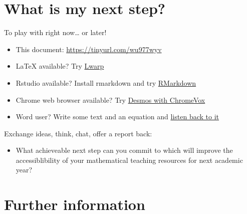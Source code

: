 \documentclass[
  12pt,
  a4paper]{extarticle}
\providecommand{\tightlist}{%
  \setlength{\itemsep}{0pt}\setlength{\parskip}{0pt}}
\theoremstyle{plain}
\theoremstyle{plain}
\theoremstyle{plain}
\theoremstyle{plain}
\theoremstyle{plain}
\theoremstyle{definition}
\theoremstyle{definition}
\theoremstyle{definition}
\theoremstyle{remark}
\renewcommand{\;}{\,}
\begin{document}
\hypertarget{what-is-my-next-step}{%
\section{What is my next step?}\label{what-is-my-next-step}}

To play with right now\ldots{} or later!

\begin{itemize}
\tightlist
\item
  This document: \url{https://tinyurl.com/wu977wyv}
\item
  LaTeX available? Try \href{https://github.com/STEM-Enable/Getting-started-with-accessible-maths-March-2023/raw/main/example/LwarpExample.zip}{Lwarp}
\item
  Rstudio available? Install rmarkdown and try \href{https://stem-enable.github.io/RMarkdownWorkshop/}{RMarkdown}
\item
  Chrome web browser available? Try \href{https://people.bath.ac.uk/cspehj/coventry/arclengthInR.html}{Desmos with ChromeVox}
\item
  Word user? Write some text and an equation and \href{https://stem-enable.github.io/WordWorkshop/immersive.html}{listen back to it}
\end{itemize}

Exchange ideas, think, chat, offer a report back:

\begin{itemize}
\tightlist
\item
  What achieveable next step can you commit to which will improve the accessiblibility of your mathematical teaching resources for next academic year?
\end{itemize}

\hypertarget{further-information}{%
\section{Further information}\label{further-information}}
\end{document}

